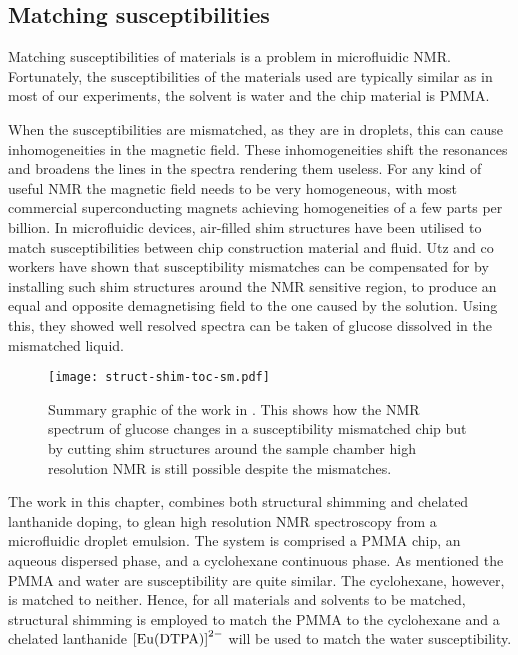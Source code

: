 \subsection{Matching susceptibilities}


Matching susceptibilities of materials is a problem in microfluidic NMR. Fortunately, the susceptibilities
of the materials used are typically similar as
in most of our experiments, the solvent is water and the chip material is PMMA.

When the susceptibilities are mismatched, as they are in droplets, this can cause inhomogeneities in
the magnetic field. These inhomogeneities shift the resonances and broadens the lines in the spectra rendering them
useless. For any kind of useful NMR the magnetic field needs to be very homogeneous, with most commercial
superconducting magnets achieving homogeneities of a few parts per billion. In microfluidic devices,
air-filled shim structures have been utilised to match susceptibilities between chip construction material
and fluid. Utz and co workers \citep{RN118}
have shown that susceptibility mismatches can be
compensated for by installing such shim structures around the NMR sensitive region, to produce an
equal and opposite demagnetising field to the one caused by the solution. Using this, they showed well
resolved spectra can be taken of glucose dissolved in the mismatched liquid.
\begin{figure}
  \begin{center}
  \texttt{[image: struct-shim-toc-sm.pdf]}
  \end{center}
  \caption{Summary graphic of the work in \citep{RN118}. This shows how the NMR spectrum of glucose
  changes in a susceptibility mismatched chip but by cutting shim structures around the sample chamber high resolution
  NMR is still possible despite the mismatches.}
  \label{ShimStructUtz}
\end{figure}

The work in this chapter, combines both structural shimming and chelated lanthanide doping, to glean high resolution NMR spectroscopy
from a microfluidic droplet emulsion. The system is comprised a PMMA chip, an aqueous dispersed phase, and a cyclohexane
continuous phase. As mentioned the PMMA and water are susceptibility are quite similar. The cyclohexane, however, is matched to
neither. Hence,  for all materials and solvents to be matched, structural shimming is employed to match the PMMA
to the cyclohexane and a chelated lanthanide $\ce{[Eu(DTPA)]}^{2-}$  will be used to match the water susceptibility.

